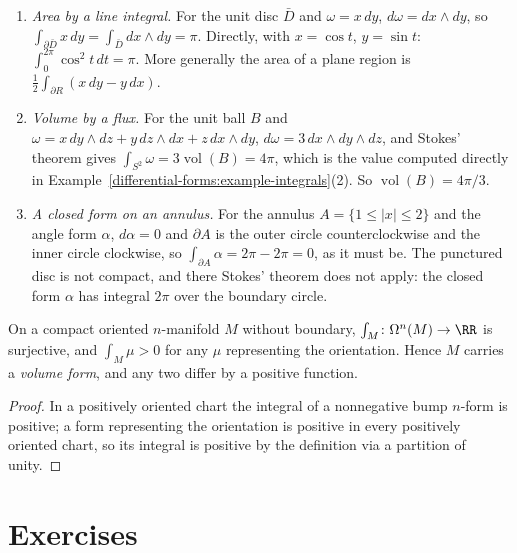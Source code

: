 \begin{example}\label{differential-forms:example-stokes-checks}
\begin{enumerate}
\item \emph{Area by a line integral.} For the unit disc $\bar D$ and $\omega = x\,dy$, $d\omega = dx \wedge dy$, so $\int_{\partial\bar D}x\,dy = \int_{\bar D}dx \wedge dy = \pi$. Directly, with
$x = \cos t$, $y = \sin t$: $\int_0^{2\pi}\cos^2t\,dt = \pi$. More generally the area of a plane region is $\frac12\int_{\partial R}(x\,dy - y\,dx)$.
\item \emph{Volume by a flux.} For the unit ball $B$ and $\omega = x\,dy \wedge dz + y\,dz \wedge dx + z\,dx \wedge dy$, $d\omega = 3\,dx \wedge dy \wedge dz$, and Stokes' theorem gives
$\int_{S^2}\omega = 3\operatorname{vol}(B) = 4\pi$, which is the value computed directly in Example~\ref{differential-forms:example-integrals}(2). So $\operatorname{vol}(B) = 4\pi/3$.
\item \emph{A closed form on an annulus.} For the annulus $A = \{1 \leq |x| \leq 2\}$ and the angle form $\alpha$, $d\alpha = 0$ and $\partial A$ is the outer circle counterclockwise and the
inner circle clockwise, so $\int_{\partial A}\alpha = 2\pi - 2\pi = 0$, as it must be. The punctured disc is not compact, and there Stokes' theorem does not apply: the closed form $\alpha$
has integral $2\pi$ over the boundary circle.
\end{enumerate}
\end{example}

\begin{corollary}\label{differential-forms:corollary-volume}
On a compact oriented $n$-manifold $M$ without boundary, $\int_M \colon \Omega^n(M) \to \RR$ is surjective, and $\int_M\mu > 0$ for any $\mu$ representing the orientation. Hence $M$ carries a \emph{volume
form}, and any two differ by a positive function.
\end{corollary}

\begin{proof}
In a positively oriented chart the integral of a nonnegative bump $n$-form is positive; a form representing the orientation is positive in every positively oriented chart, so its integral is positive by the
definition via a partition of unity.
\end{proof}

\section{Exercises}\label{differential-forms:section-exercises}

